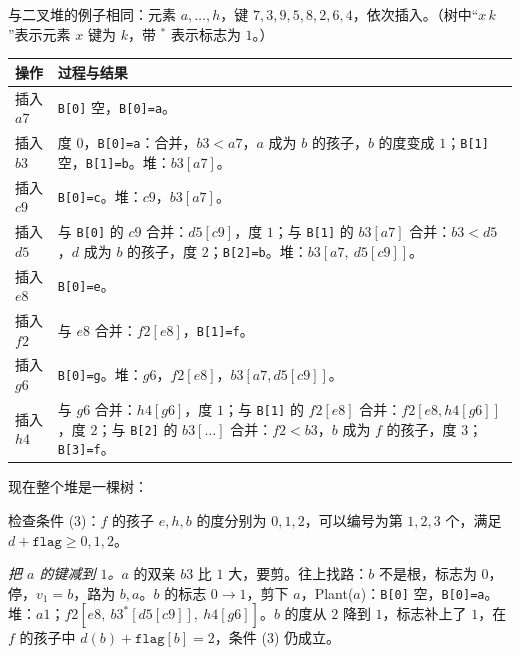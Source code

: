 \begin{example}\label{ex:mst-prim:fib}
与二叉堆的例子相同：元素 $a,\dots,h$，键 $7,3,9,5,8,2,6,4$，依次插入。（树中“$x\,k$”表示元素 $x$ 键为 $k$，带 $^*$ 表示标志为 $1$。）
\begin{center}
\small
\begin{tabular}{lp{10.2cm}}
\toprule
操作 & 过程与结果 \\
\midrule
插入 $a7$ & \texttt{B[0]} 空，\texttt{B[0]=a}。 \\
插入 $b3$ & 度 $0$，\texttt{B[0]=a}：合并，$b3<a7$，$a$ 成为 $b$ 的孩子，$b$ 的度变成 $1$；\texttt{B[1]} 空，\texttt{B[1]=b}。堆：$b3[a7]$。 \\
插入 $c9$ & \texttt{B[0]=c}。堆：$c9$，$b3[a7]$。 \\
插入 $d5$ & 与 \texttt{B[0]} 的 $c9$ 合并：$d5[c9]$，度 $1$；与 \texttt{B[1]} 的 $b3[a7]$ 合并：$b3<d5$，$d$ 成为 $b$ 的孩子，度 $2$；\texttt{B[2]=b}。堆：$b3[a7,\ d5[c9]]$。 \\
插入 $e8$ & \texttt{B[0]=e}。 \\
插入 $f2$ & 与 $e8$ 合并：$f2[e8]$，\texttt{B[1]=f}。 \\
插入 $g6$ & \texttt{B[0]=g}。堆：$g6$，$f2[e8]$，$b3[a7,d5[c9]]$。 \\
插入 $h4$ & 与 $g6$ 合并：$h4[g6]$，度 $1$；与 \texttt{B[1]} 的 $f2[e8]$ 合并：$f2[e8,h4[g6]]$，度 $2$；与 \texttt{B[2]} 的 $b3[\dots]$ 合并：$f2<b3$，$b$ 成为 $f$ 的孩子，度 $3$；\texttt{B[3]=f}。 \\
\bottomrule
\end{tabular}
\end{center}
现在整个堆是一棵树：
\begin{center}
\end{center}
检查条件 (3)：$f$ 的孩子 $e,h,b$ 的度分别为 $0,1,2$，可以编号为第 $1,2,3$ 个，满足 $d+\texttt{flag}\geqslant0,1,2$。

\emph{把 $a$ 的键减到 $1$。}$a$ 的双亲 $b3$ 比 $1$ 大，要剪。往上找路：$b$ 不是根，标志为 $0$，停，$v_1=b$，路为 $b,a$。$b$ 的标志 $0\to1$，剪下 $a$，Plant($a$)：\texttt{B[0]} 空，\texttt{B[0]=a}。堆：$a1$；$f2[e8,\ b3^*[d5[c9]],\ h4[g6]]$。$b$ 的度从 $2$ 降到 $1$，标志补上了 $1$，在 $f$ 的孩子中 $d(b)+\texttt{flag}[b]=2$，条件 (3) 仍成立。


\end{example}
